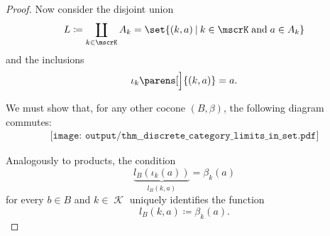 \begin{proof}
   Now consider the disjoint union
  \begin{equation*}
    L \coloneqq \coprod_{k \in \mscrK} A_k = \set{ (k, a) \given k \in \mscrK \T{and} a \in A_k }
  \end{equation*}
  and the inclusions
  \begin{equation*}
    \iota_k\parens[\Big]{ (k, a) } = a.
  \end{equation*}

  We must show that, for any other cocone \( (B, \beta) \), the following diagram commutes:
  \begin{equation}\label{eq:thm:discrete_category_limits_in_set/colimit}
    \begin{aligned}
      \texttt{[image: output/thm\_\_discrete\_category\_limits\_in\_set.pdf]}
    \end{aligned}
  \end{equation}

  Analogously to products, the condition
  \begin{equation*}
    \underbrace{ l_B(\iota_k(a)) }_{l_B(k, a)} = \beta_k(a)
  \end{equation*}
  for every \( b \in B \) and \( k \in \mscrK \) uniquely identifies the function
  \begin{equation*}
    l_B(k, a) \coloneqq \beta_k(a).
  \end{equation*}
\end{proof}

